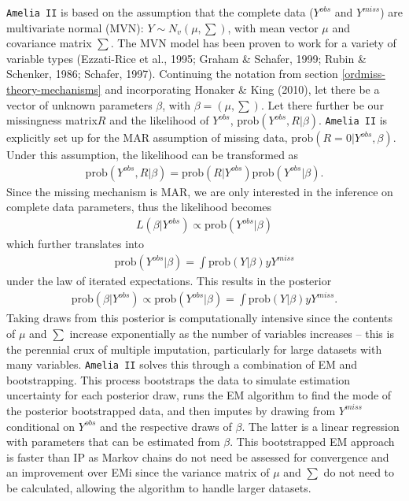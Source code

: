\documentclass[12pt,econ]{sources/authesis}
\begin{document}
\texttt{Amelia\ II} is based on the assumption that the complete data (\(Y^{obs}\) and \(Y^{miss}\)) are multivariate normal (MVN): \(Y \sim N_v(\mu, \sum)\), with mean vector \(\mu\) and covariance matrix \(\sum\). The MVN model has been proven to work for a variety of variable types (Ezzati-Rice et al., 1995; Graham \& Schafer, 1999; Rubin \& Schenker, 1986; Schafer, 1997). Continuing the notation from section \ref{ordmiss-theory-mechanisms} and incorporating Honaker \& King (2010), let there be a vector of unknown parameters \(\beta\), with \(\beta = (\mu, \sum)\). Let there further be our missingness matrix\(R\) and the likelihood of \(Y^{obs}\), \(\text{prob}(Y^{obs}, R | \beta)\). \texttt{Amelia\ II} is explicitly set up for the MAR assumption of missing data, \(\text{prob}(R = 0 | Y^{obs}, \beta)\). Under this assumption, the likelihood can be transformed as
\begin{align}
\text{prob}(Y^{obs}, R | \beta) = \text{prob}(R | Y^{obs}) \text{prob}(Y^{obs} | \beta).
\end{align}
Since the missing mechanism is MAR, we are only interested in the inference on complete data parameters, thus the likelihood becomes
\begin{align}
L(\beta | Y^{obs}) \propto \text{prob}(Y^{obs} | \beta)
\end{align}
which further translates into
\begin{align}
\text{prob}(Y^{obs} | \beta) = \int \text{prob}(Y | \beta) y Y^{miss}
\end{align}
under the law of iterated expectations. This results in the posterior
\begin{align}
\text{prob}(\beta | Y^{obs}) \propto \text{prob}(Y^{obs} | \beta) = \int \text{prob}(Y | \beta) y Y^{miss}.
\end{align}
Taking draws from this posterior is computationally intensive since the contents of \(\mu\) and \(\sum\) increase exponentially as the number of variables increases -- this is the perennial crux of multiple imputation, particularly for large datasets with many variables. \texttt{Amelia\ II} solves this through a combination of EM and bootstrapping. This process bootstraps the data to simulate estimation uncertainty for each posterior draw, runs the EM algorithm to find the mode of the posterior bootstrapped data, and then imputes by drawing from \(Y^{miss}\) conditional on \(Y^{obs}\) and the respective draws of \(\beta\). The latter is a linear regression with parameters that can be estimated from \(\beta\). This bootstrapped EM approach is faster than IP as Markov chains do not need be assessed for convergence and an improvement over EMi since the variance matrix of \(\mu\) and \(\sum\) do not need to be calculated, allowing the algorithm to handle larger datasets.
\end{document}
